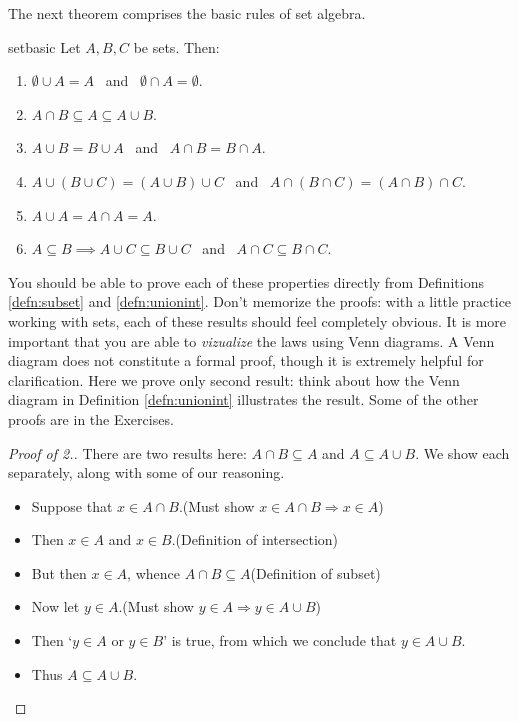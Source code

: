 The next theorem comprises the basic rules of set algebra.

\begin{thm}{}{setbasic}
Let $A,B,C$ be sets. Then:
\begin{enumerate}\setlength{\itemsep}{0pt}
\item $\emptyset\cup A=A$ \ and \ $\emptyset\cap A=\emptyset$.
\item $A\cap B\subseteq A\subseteq A\cup B$.
\item $A\cup B=B\cup A$ \ and \ $A\cap B=B\cap A$.
\item $A\cup (B\cup C)=(A\cup B)\cup C$ \ and \ $A\cap (B\cap C)=(A\cap B)\cap C$.
\item $A\cup A=A\cap A=A$.
\item $A\subseteq B\implies A\cup C\subseteq B\cup C$ \ and \ $A\cap C\subseteq B\cap C$.
\end{enumerate}
\end{thm}

 You should be able to prove each of these properties directly from Definitions \ref{defn:subset} and \ref{defn:unionint}. Don't memorize the proofs: with a little practice working with sets, each of these results should feel completely obvious. It is more important that you are able to \emph{vizualize} the laws using Venn diagrams. A Venn diagram does not constitute a formal proof, though it is extremely helpful for clarification. Here we prove only second result: think about how the Venn diagram in Definition \ref{defn:unionint} illustrates the result. Some of the other proofs are in the Exercises.

\begin{proof}[Proof of 2.]
There are two results here: $A\cap B\subseteq A$ and $A\subseteq A\cup B$. We show each separately, along with some of our reasoning.
\begin{itemize}\setlength{\itemsep}{-2pt}
  \item[]Suppose that $x\in A\cap B$.\hfill(Must show $x\in A\cap B\Rightarrow x\in A$)
  \item[]Then $x\in A$ and $x\in B$.\hfill(Definition of intersection)
  \item[]But then $x\in A$, whence $A\cap B\subseteq A$\hfill(Definition of subset)
  \item[]Now let $y\in A$.\hfill(Must show $y\in A\Rightarrow y\in A\cup B$)
  \item[]Then `$y\in A$ or $y\in B$' is true, from which we conclude that $y\in A\cup B$.
  \item[]Thus $A\subseteq A\cup B$.\qedhere
\end{itemize}
\end{proof}

